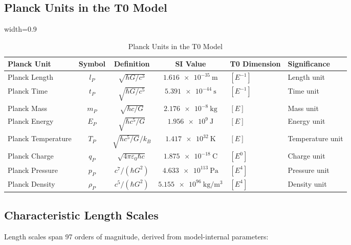 ﻿\documentclass[12pt,a4paper]{article}
\newcommand{\tablescale}{0.9}
\begin{document}
\begin{itemize}
	\subsection{Planck Units in the T0 Model}
	\label{subsec:planck_units}
	
	\begin{table}[htbp]
		\centering
		\begin{adjustbox}{width=\tablescale\textwidth}
			\begin{tabular}{lcccll}
				\toprule
				\textbf{Planck Unit} & \textbf{Symbol} & \textbf{Definition} & \textbf{SI Value} & \textbf{T0 Dimension} & \textbf{Significance} \\
				\midrule
				Planck Length & \(l_P\) & \(\sqrt{\hbar G/c^3}\) & \(\SI{1.616e-35}{\meter}\) & \([E^{-1}]\) & Length unit \\
				Planck Time & \(t_P\) & \(\sqrt{\hbar G/c^5}\) & \(\SI{5.391e-44}{\second}\) & \([E^{-1}]\) & Time unit \\
				Planck Mass & \(m_P\) & \(\sqrt{\hbar c/G}\) & \(\SI{2.176e-8}{\kilogram}\) & \([E]\) & Mass unit \\
				Planck Energy & \(E_P\) & \(\sqrt{\hbar c^5/G}\) & \(\SI{1.956e9}{\joule}\) & \([E]\) & Energy unit \\
				Planck Temperature & \(T_P\) & \(\sqrt{\hbar c^5/G}/k_B\) & \(\SI{1.417e32}{\kelvin}\) & \([E]\) & Temperature unit \\
				Planck Charge & \(q_P\) & \(\sqrt{4\pi \varepsilon_0 \hbar c}\) & \(\SI{1.875e-18}{\coulomb}\) & \([E^0]\) & Charge unit \\
				Planck Pressure & \(p_P\) & \(c^7/(\hbar G^2)\) & \(\SI{4.633e113}{\pascal}\) & \([E^4]\) & Pressure unit \\
				Planck Density & \(\rho_P\) & \(c^5/(\hbar G^2)\) & \(\SI{5.155e96}{\kilogram\per\meter\cubed}\) & \([E^4]\) & Density unit \\
				\bottomrule
			\end{tabular}
		\end{adjustbox}
		\caption{Planck Units in the T0 Model}
		\label{tab:planck_units}
	\end{table}
	
	\subsection{Characteristic Length Scales}
	\label{sec:length_scales}
	
	Length scales span 97 orders of magnitude, derived from model-internal parameters:
	

\end{itemize}
\end{document}

